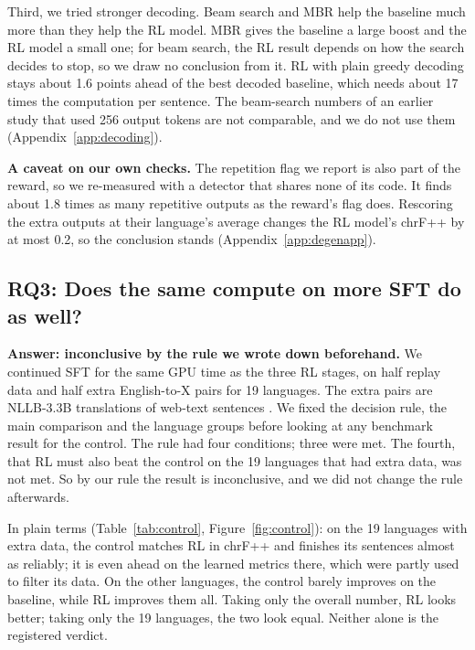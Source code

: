 Third, we tried stronger decoding. Beam search and MBR help the baseline much more than they help the RL model. MBR gives the baseline a large boost and the RL model a small one; for beam search, the RL result depends on how the search decides to stop, so we draw no conclusion from it. RL with plain greedy decoding stays about 1.6 points ahead of the best decoded baseline, which needs about 17 times the computation per sentence. The beam-search numbers of an earlier study that used 256 output tokens are not comparable, and we do not use them (Appendix~\ref{app:decoding}).

\textbf{A caveat on our own checks.} The repetition flag we report is also part of the reward, so we re-measured with a detector that shares none of its code. It finds about 1.8 times as many repetitive outputs as the reward's flag does. Rescoring the extra outputs at their language's average changes the RL model's chrF++ by at most 0.2, so the conclusion stands (Appendix~\ref{app:degenapp}).

\subsection{RQ3: Does the same compute on more SFT do as well?}\label{sec:rq3}
\textbf{Answer: inconclusive by the rule we wrote down beforehand.} We continued SFT for the same GPU time as the three RL stages, on half replay data and half extra English-to-X pairs for 19 languages. The extra pairs are NLLB-3.3B translations of web-text sentences \citep{gritta2026translatepsy}. We fixed the decision rule, the main comparison and the language groups before looking at any benchmark result for the control. The rule had four conditions; three were met. The fourth, that RL must also beat the control on the 19 languages that had extra data, was not met. So by our rule the result is inconclusive, and we did not change the rule afterwards.

In plain terms (Table~\ref{tab:control}, Figure~\ref{fig:control}): on the 19 languages with extra data, the control matches RL in chrF++ and finishes its sentences almost as reliably; it is even ahead on the learned metrics there, which were partly used to filter its data. On the other languages, the control barely improves on the baseline, while RL improves them all. Taking only the overall number, RL looks better; taking only the 19 languages, the two look equal. Neither alone is the registered verdict.

